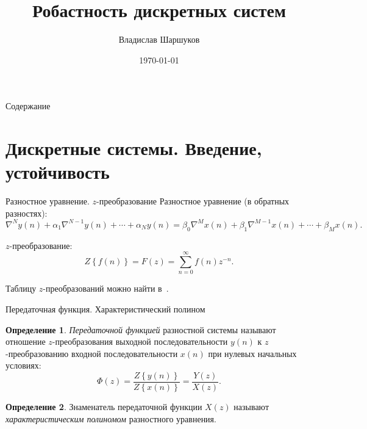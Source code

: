 \documentclass[notheorems,aspectratio=169]{beamer}
\author{Владислав Шаршуков}
\date{\today}
\title{Робастность дискретных систем}
\theoremstyle{definition}
\newtheorem{definition}{Определение}
\begin{document}
\begin{frame}
  \titlepage{}
\end{frame}

\begin{frame}{Содержание}
  \tableofcontents
\end{frame}

\section{Дискретные системы. Введение, устойчивость}

\begin{frame}{Разностное уравнение. $z$-преобразование}
  Разностное уравнение (в обратных разностях):
  \begin{equation*}
    \nabla^N y(n) + \alpha_1 \nabla^{N-1} y(n) + \cdots + \alpha_N y(n) = 
    \beta_0 \nabla^M x(n) + \beta_1 \nabla^{M-1} x(n) + \cdots + \beta_M x(n).
  \end{equation*}

  $z$-преобразование:
  \begin{equation*}
    Z\left\{ f(n) \right\} = F(z) = \sum_{n=0}^\infty f(n) z^{-n}.
  \end{equation*}

  Таблицу $z$-преобразований можно найти в~\cite[с.~255]{Kargu1974}.
\end{frame}

\begin{frame}{Передаточная функция. Характеристический полином}
  \begin{definition}
    \textit{Передаточной функцией} разностной системы называют отношение
    $z$-преобразования выходной последовательности $y(n)$ к $z$-преобразованию
    входной последовательности $x(n)$ при нулевых начальных условиях:
    \begin{equation*}
      \Phi(z) = \frac{Z\left\{ y(n) \right\}}{Z\left\{ x(n)\right\}} = \frac{Y(z)}{X(z)}.
    \end{equation*}
  \end{definition}

  \begin{definition}
    Знаменатель передаточной функции $X(z)$ называют \textit{характеристическим полиномом} разностного уравнения.
  \end{definition}
\end{frame}
\end{document}
